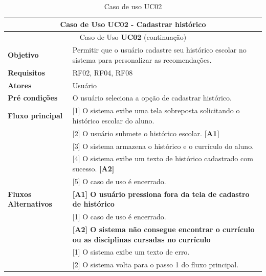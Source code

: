 \begin{longtable}{ | m{} | m{} | }
    
    \hline\hline    
    \multicolumn{2}{|c|}{Caso de Uso \textbf{UC02} - Cadastrar histórico}\tabularnewline\hline\hline\endfirsthead
    \hline\hline
    \multicolumn{2}{|c|}{Caso de Uso \textbf{UC02} (continuação)}\tabularnewline\hline\hline\endhead
    \hline\endfoot
    \hline\caption{Caso de uso UC02}\endlastfoot

    \textbf{Objetivo} & Permitir que o usuário cadastre seu histórico escolar no sistema para personalizar as recomendações.\tabularnewline\hline
    \textbf{Requisitos} & RF02, RF04, RF08\tabularnewline\hline
    \textbf{Atores} & Usuário\tabularnewline\hline
    \textbf{Pré condições} & O usuário seleciona a opção de cadastrar histórico.\tabularnewline\hline

    \multirow{1}{*}{\textbf{Fluxo principal}} & [1] O sistema exibe uma tela sobreposta solicitando o histórico escolar do aluno.\tabularnewline\cline{2-2}
    & [2] O usuário submete o histórico escolar. \textbf{[A1]}\tabularnewline\cline{2-2}
    & [3] O sistema armazena o histórico e o currículo do aluno.\tabularnewline\cline{2-2}
    & [4] O sistema exibe um texto de histórico cadastrado com sucesso. \textbf{[A2]}\tabularnewline\cline{2-2}
    & [5] O caso de uso é encerrado.\tabularnewline\hline

    \multirow{1}{*}{\textbf{Fluxos Alternativos}} & \textbf{[A1] O usuário pressiona fora da tela de cadastro de histórico}\tabularnewline\cline{2-2}
    & [1] O caso de uso é encerrado.\tabularnewline\cline{2-2}

    & \textbf{[A2] O sistema não consegue encontrar o currículo ou as disciplinas cursadas no currículo}\tabularnewline\cline{2-2}
    & [1] O sistema exibe um texto de erro.\tabularnewline\cline{2-2}
    & [2] O sistema volta para o passo 1 do fluxo principal. 
    \label{tab:uc02}
\end{longtable}


